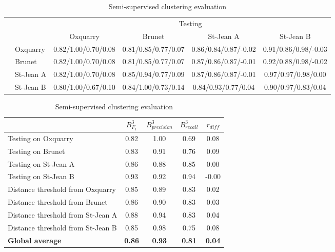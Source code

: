\begin{table}
  \centering
  \caption{Semi-supervised clustering evaluation}
  \label{tab:semi_supervised_clustering}

  \label{tab:semi_supervised_clustering_train_test}
  \begin{tabular}{l l| c c c c}
    \toprule
    \multicolumn{2}{c}{\multirow{2}{*}{}} & \multicolumn{4}{c}{Testing} \\
    \multicolumn{2}{c}{} & Oxquarry & Brunet & St-Jean A & St-Jean B \\
    \midrule
    \parbox[t]{2mm}{}
    & Oxquarry
    & 0.82/1.00/0.70/0.08
    & 0.81/0.85/0.77/0.07
    & 0.86/0.84/0.87/-0.02
    & 0.91/0.86/0.98/-0.03
    \\
    & Brunet
    & 0.82/1.00/0.70/0.08
    & 0.81/0.85/0.77/0.07
    & 0.87/0.86/0.87/-0.01
    & 0.92/0.88/0.98/-0.02
    \\
    & St-Jean A
    & 0.82/1.00/0.70/0.08
    & 0.85/0.94/0.77/0.09
    & 0.87/0.86/0.87/-0.01
    & 0.97/0.97/0.98/0.00
    \\
    & St-Jean B
    & 0.80/1.00/0.67/0.10
    & 0.84/1.00/0.73/0.14
    & 0.84/0.93/0.77/0.04
    & 0.90/0.97/0.83/0.04
    \\
    \bottomrule
  \end{tabular}

  \label{tab:semi_supervised_clustering_average}
  \begin{tabular}{l c c c c}
    \toprule
    & $B^{3}_{F_1}$
    & $B^{3}_{precision}$
    & $B^{3}_{recall}$
    & $r_{diff}$ \\
    \midrule
    Testing on Oxquarry               & 0.82 & 1.00 & 0.69 &  0.08 \\
    Testing on Brunet                 & 0.83 & 0.91 & 0.76 &  0.09 \\
    Testing on St-Jean A              & 0.86 & 0.88 & 0.85 &  0.00 \\
    Testing on St-Jean B              & 0.93 & 0.92 & 0.94 & -0.00 \\
    Distance threshold from Oxquarry  & 0.85 & 0.89 & 0.83 & 0.02 \\
    Distance threshold from Brunet    & 0.86 & 0.90 & 0.83 & 0.03 \\
    Distance threshold from St-Jean A & 0.88 & 0.94 & 0.83 & 0.04 \\
    Distance threshold from St-Jean B & 0.85 & 0.98 & 0.75 & 0.08 \\
    \textbf{Global average} & \textbf{0.86} & \textbf{0.93} & \textbf{0.81} & \textbf{0.04} \\
    \bottomrule
  \end{tabular}
\end{table}

